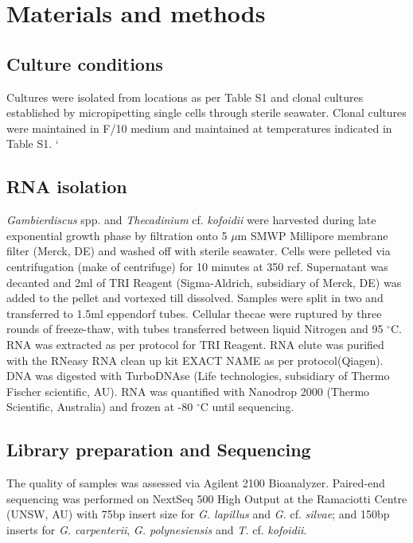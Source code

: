 \documentclass[12pt]{article}
\begin{document}


\newpage
\section{Materials and methods}
\subsection*{Culture conditions}
\FloatBarrier
Cultures were isolated from locations as per Table S1 and clonal cultures established by micropipetting single cells through sterile seawater. 
Clonal cultures were maintained in F/10 medium and maintained at temperatures indicated in Table S1. 
`
\subsection*{RNA isolation}
\emph{Gambierdiscus} spp. and \emph{Thecadinium} cf. \emph{kofoidii} were harvested during late exponential growth phase by filtration onto 5 $\mu$m SMWP Millipore membrane filter (Merck, DE) and washed off with sterile seawater. 
Cells were pelleted via centrifugation (make of centrifuge) for 10 minutes at 350 rcf. 
Supernatant was decanted and 2ml of TRI Reagent (Sigma-Aldrich, subsidiary of Merck, DE) was added to the pellet and vortexed till dissolved. 
Samples were split in two and transferred to 1.5ml eppendorf tubes. 
Cellular thecae were ruptured by three rounds of freeze-thaw, with tubes transferred between liquid Nitrogen and 95 $^{\circ}$C. 
RNA was extracted as per protocol for TRI Reagent. 
RNA elute was purified with the RNeasy RNA clean up kit EXACT NAME as per protocol(Qiagen). 
DNA was digested with TurboDNAse (Life technologies, subsidiary of Thermo Fischer scientific, AU). 
RNA was quantified with Nanodrop 2000 (Thermo Scientific, Australia) and frozen at -80 $^{\circ}$C until sequencing.
 
\subsection*{Library preparation and Sequencing}
The quality of samples was assessed via Agilent 2100 Bioanalyzer. 
Paired-end sequencing was performed on NextSeq 500 High Output at the Ramaciotti Centre (UNSW, AU) with 75bp insert size for \emph{G. lapillus} and \emph{G.} cf. \emph{silvae}; and 150bp inserts for \emph{G. carpenterii}, \emph{G. polynesiensis} and \emph{T.} cf. \emph{kofoidii}.
\end{document}

